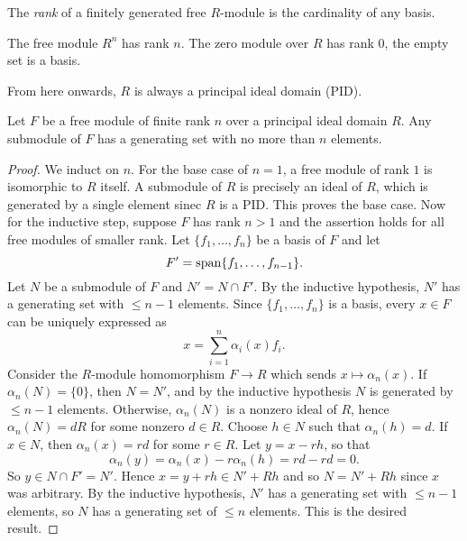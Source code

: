 \begin{definition}
  The \emph{rank} of a finitely generated free $R$-module
  is the cardinality of any basis.
\end{definition}

\begin{remark}
  The free module $R^n$ has rank $n$. The zero
  module over $R$ has rank $0$, the empty set is a basis.
\end{remark}

\begin{remark}
  From here onwards, $R$ is always a principal ideal
  domain (PID).
\end{remark}

\begin{lemma}
  Let $F$ be a free module of finite rank $n$ over a
  principal ideal domain $R$. Any submodule of $F$ has
  a generating set with no more than $n$ elements.
\end{lemma}

\begin{proof}
  We induct on $n$. For the base case of $n = 1$, a
  free module of rank $1$ is isomorphic to $R$ itself.
  A submodule of $R$ is precisely an ideal of $R$, which
  is generated by a single element sinec $R$ is a PID.
  This proves the base case. Now for the inductive step,
  suppose $F$ has rank $n > 1$ and the assertion holds for
  all free modules of smaller rank. Let $\{f_1, \dots, f_n\}$
  be a basis of $F$ and let
  \[
    F' = \operatorname{span}\{f_1, \dots, f_{n - 1}\}.
  \]
  Let $N$ be a submodule of $F$ and $N' = N \cap F'$.
  By the inductive hypothesis, $N'$ has a generating set
  with $\le n - 1$ elements. Since $\{f_1, \dots, f_n\}$
  is a basis, every $x \in F$ can be uniquely expressed
  as
  \[
    x = \sum_{i = 1}^n \alpha_i(x) f_i.
  \]
  Consider the $R$-module homomorphism $F \to R$ which
  sends $x \mapsto \alpha_n(x)$. If $\alpha_n(N) = \{0\}$,
  then $N = N'$, and by the inductive hypothesis
  $N$ is generated by $\le n - 1$ elements. Otherwise,
  $\alpha_n(N)$ is a nonzero ideal of $R$, hence
  $\alpha_n(N) = dR$
  for some nonzero $d \in R$. Choose $h \in N$ such that
  $\alpha_n(h) = d$. If $x \in N$, then  $\alpha_n(x) = rd$
  for some $r \in R$. Let $y = x - rh$, so that
  \[
    \alpha_n(y) = \alpha_n(x) - r \alpha_n(h) = rd - rd
    = 0.
  \]
  So $y \in N \cap F' = N'$. Hence $x = y + rh \in N' + Rh$
  and so $N = N' + Rh$ since $x$ was arbitrary. By
  the inductive hypothesis, $N'$ has a generating
  set with $\le n - 1$ elements, so $N$ has a generating
  set of $\le n$ elements. This is the desired result.
\end{proof}

